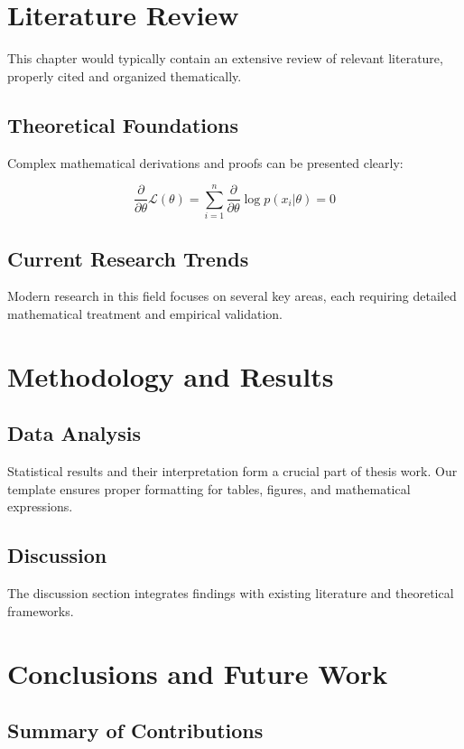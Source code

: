 \documentclass[12pt,cjk]{e_class_thesis}
\begin{document}
\chapter{Literature Review}

This chapter would typically contain an extensive review of relevant literature, properly cited and organized thematically.

\section{Theoretical Foundations}

Complex mathematical derivations and proofs can be presented clearly:

$$\frac{\partial}{\partial \theta} \mathcal{L}(\theta) = \sum_{i=1}^{n} \frac{\partial}{\partial \theta} \log p(x_i|\theta) = 0$$

\section{Current Research Trends}

Modern research in this field focuses on several key areas, each requiring detailed mathematical treatment and empirical validation.

\chapter{Methodology and Results}

\section{Data Analysis}

Statistical results and their interpretation form a crucial part of thesis work. Our template ensures proper formatting for tables, figures, and mathematical expressions.

\section{Discussion}

The discussion section integrates findings with existing literature and theoretical frameworks.

\chapter{Conclusions and Future Work}

\section{Summary of Contributions}
\end{document}
